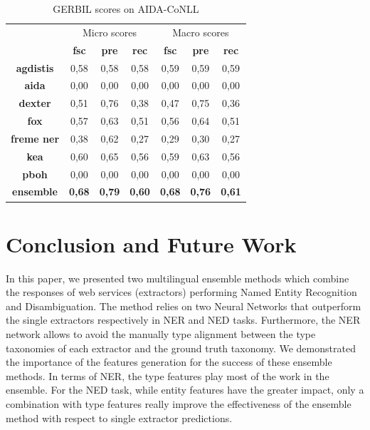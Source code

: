 \documentclass{llncs}
\begin{document}
 \begin{table}
      \centering
      \setlength{\tabcolsep}{12pt}
        \begin{tabular}{c|c|c|c|c|c|c|}
          \multicolumn{1}{c}{ } &
          \multicolumn{3}{|c|}{Micro scores} & 
          \multicolumn{3}{|c|}{Macro scores} \\
           \multicolumn{1}{c|}{ } & \textbf{fsc} & \textbf{pre} & \textbf{rec}
           & \textbf{fsc} & \textbf{pre} & \textbf{rec} \\ \hline
            \textbf{agdistis}         & 0,58  & 0,58   & 0,58  &  0,59  & 0,59   & 0,59  \\ \hline
            \textbf{aida}         & 0,00  & 0,00   & 0,00  &   0,00  & 0,00   & 0,00   \\ \hline
            \textbf{dexter}         & 0,51  & 0,76   & 0,38  &   0,47  & 0,75   & 0,36   \\ \hline
            \textbf{fox}         & 0,57  & 0,63   & 0,51  & 0,56  & 0,64   & 0,51   \\ \hline
            \textbf{freme ner}         & 0,38  & 0,62   & 0,27  &   0,29  & 0,30   & 0,27   \\ \hline
            \textbf{kea}          & 0,60  & 0,65   & 0,56  &   0,59  & 0,63   & 0,56  \\ \hline
            \textbf{pboh}         & 0,00  & 0,00   & 0,00  &   0,00  & 0,00   & 0,00   \\ \hline \hline
            \textbf{ensemble}        & \textbf{0,68}   & \textbf{0,79}   & \textbf{0,60} & \textbf{0,68}   & \textbf{0,76}   & \textbf{0,61}  \\ \hline
        \end{tabular}
    \caption{GERBIL scores on AIDA-CoNLL}
    \label{linkscoresgerbilaida}
\end{table}







\section{Conclusion and Future Work}
\label{sec:conclusion}
In this paper, we presented two multilingual ensemble methods which combine the responses of web services (extractors) performing Named Entity Recognition and Disambiguation. The method relies on two Neural Networks that outperform the single extractors respectively in NER and NED tasks. Furthermore, the NER network allows to avoid the manually type alignment between the type taxonomies of each extractor and the ground truth taxonomy. We demonstrated the importance of the features generation for the success of these ensemble methods. In terms of NER, the type features play most of the work in the ensemble. For the NED task, while entity features have the greater impact, only a combination with type features really improve the effectiveness of the ensemble method with respect to single extractor predictions.
\end{document}
